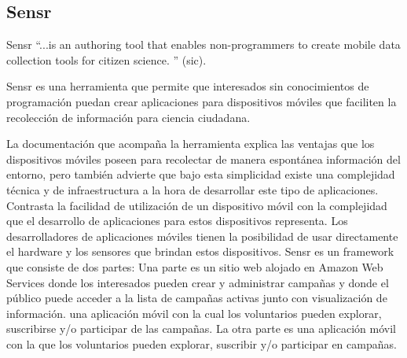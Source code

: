 \subsection{Sensr}

Sensr “...is an authoring tool that enables non-programmers to create mobile data collection tools for citizen science. ” (sic). 

Sensr es una herramienta que permite que interesados sin conocimientos de programación
puedan crear aplicaciones para dispositivos móviles que faciliten la recolección de información para ciencia ciudadana. 

La documentación que acompaña la herramienta explica las ventajas que los dispositivos móviles poseen para recolectar de manera espontánea información del entorno, pero también advierte que bajo esta simplicidad existe una complejidad técnica y de infraestructura a la hora de desarrollar este tipo de aplicaciones. Contrasta la facilidad de utilización de un dispositivo móvil con la complejidad que el desarrollo de aplicaciones para estos dispositivos representa. Los desarrolladores de aplicaciones móviles tienen la posibilidad de usar directamente el hardware y los sensores que brindan estos dispositivos. 
Sensr es un framework que consiste de dos partes:
Una parte es un sitio web alojado en Amazon Web Services donde los interesados pueden crear y administrar campañas y donde el público puede acceder a la lista de campañas activas junto con visualización de información. una aplicación móvil con la cual los voluntarios pueden explorar, suscribirse y/o participar de las campañas. La otra parte es una aplicación móvil con la que los voluntarios pueden explorar, suscribir y/o participar en campañas.\cite{kim2013sensr}


